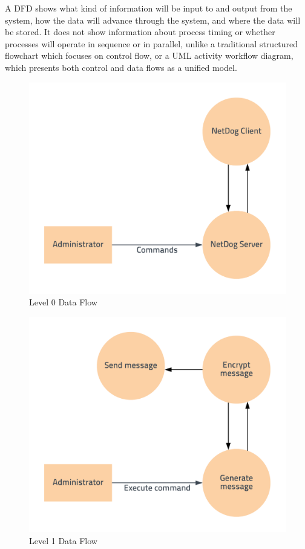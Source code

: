 A DFD shows what kind of information will be input to and output from the
system, how the data will advance through the system, and where the data will
be stored. It does not show information about process timing or whether
processes will operate in sequence or in parallel, unlike a traditional
structured flowchart which focuses on control flow, or a UML activity workflow
diagram, which presents both control and data flows as a unified model.

\begin{figure}[H]
\includegraphics{dfd_level_0}
\caption{Level 0 Data Flow}
\end{figure}

\begin{figure}[H]
\includegraphics{dfd_level_1}
\caption{Level 1 Data Flow}
\end{figure}

